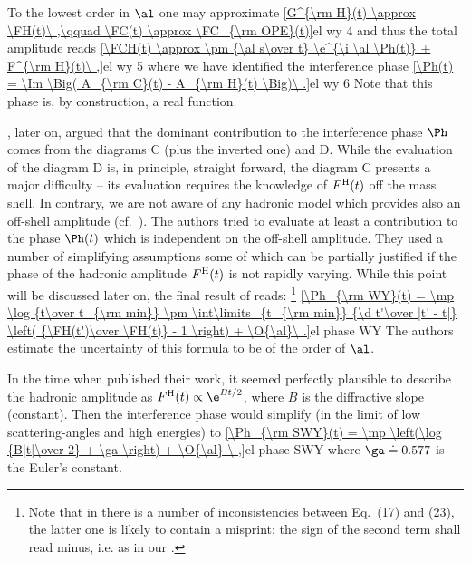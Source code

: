 To the lowest order in $\al$ one may approximate
\eqref{G^{\rm H}(t) \approx \FH(t)\ ,\qquad \FC(t) \approx \FC_{\rm OPE}(t)}{el wy 4}
and thus the total amplitude reads
\eqref{\FCH(t) \approx \pm {\al s\over t} \e^{\i \al \Ph(t)} + F^{\rm H}(t)\ ,}{el wy 5}
where we have identified the interference phase
\eqref{\Ph(t) = \Im \Big( A_{\rm C}(t) - A_{\rm H}(t) \Big)\ .}{el wy 6}
Note that this phase is, by construction, a real function.


\WY, later on, argued that the dominant contribution to the interference phase $\Ph$ comes from the diagrams  C (plus the inverted one) and D. While the evaluation of the diagram D is, in principle, straight forward, the diagram C presents a major difficulty -- its evaluation requires the knowledge of $F^{\rm H}(t)$ off the mass shell. In contrary, we are not aware of any hadronic model which provides also an off-shell amplitude (cf.~). The authors tried to evaluate at least a contribution to the phase $\Ph(t)$ which is independent on the off-shell amplitude. They used a number of simplifying assumptions some of which can be partially justified if the phase of the hadronic amplitude $F^{\rm H}(t)$ is not rapidly varying. While this point will be discussed later on, the final result of \WY{} reads: \footnote{%
Note that in  there is a number of inconsistencies between Eq.~(17) and (23), the latter one is likely to contain a misprint: the sign of the second term shall read minus, i.e. as in our .
}
\eqref{\Ph_{\rm WY}(t) = \mp \log {t\over t_{\rm min}} \pm \int\limits_{t_{\rm min}} {\d t'\over |t' - t|} \left( {\FH(t')\over \FH(t)} - 1 \right) + \O{\al}\ .}{el phase WY}
The authors estimate the uncertainty of this formula to be of the order of $\al$.

In the time when \WY{} published their work, it seemed perfectly plausible to describe the hadronic amplitude as $\FH(t) \propto \e^{Bt/2}$, where $B$ is the diffractive slope (constant). Then the interference phase would simplify (in the limit of low scattering-angles and high energies) to
\eqref{\Ph_{\rm SWY}(t) = \mp \left(\log {B|t|\over 2} + \ga \right) + \O{\al} \ ,}{el phase SWY}
where $\ga \doteq 0.577$ is the Euler's constant.

